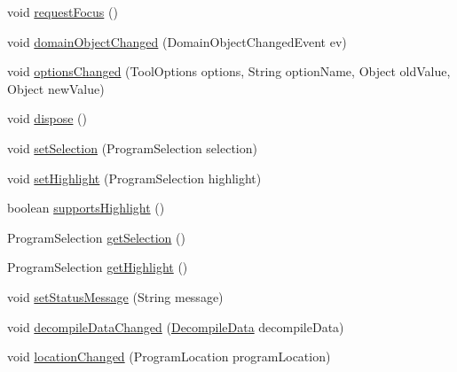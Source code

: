 \begin{DoxyCompactItemize}
\item 
void \mbox{\hyperlink{classghidra_1_1app_1_1plugin_1_1core_1_1decompile_1_1_decompiler_provider_a5beeeee3a7f121f6ab3ea59ea1cc08e1}{request\+Focus}} ()
\item 
void \mbox{\hyperlink{classghidra_1_1app_1_1plugin_1_1core_1_1decompile_1_1_decompiler_provider_a69d8ae7b9339f71a91dea1d62c5aca48}{domain\+Object\+Changed}} (Domain\+Object\+Changed\+Event ev)
\item 
void \mbox{\hyperlink{classghidra_1_1app_1_1plugin_1_1core_1_1decompile_1_1_decompiler_provider_a480fb4cdd2f86f488d1d269b53c0e872}{options\+Changed}} (Tool\+Options options, String option\+Name, Object old\+Value, Object new\+Value)
\item 
void \mbox{\hyperlink{classghidra_1_1app_1_1plugin_1_1core_1_1decompile_1_1_decompiler_provider_a6c2bbf952c8ea1a6b9623c7c3e9395c4}{dispose}} ()
\item 
void \mbox{\hyperlink{classghidra_1_1app_1_1plugin_1_1core_1_1decompile_1_1_decompiler_provider_a8f71722592aba9ce781d418d25aa8f3c}{set\+Selection}} (Program\+Selection selection)
\item 
void \mbox{\hyperlink{classghidra_1_1app_1_1plugin_1_1core_1_1decompile_1_1_decompiler_provider_a70d281d89b70480c49cf4463c829130d}{set\+Highlight}} (Program\+Selection highlight)
\item 
boolean \mbox{\hyperlink{classghidra_1_1app_1_1plugin_1_1core_1_1decompile_1_1_decompiler_provider_ad741dde6f2290fad9cb1e7ed0e83893d}{supports\+Highlight}} ()
\item 
Program\+Selection \mbox{\hyperlink{classghidra_1_1app_1_1plugin_1_1core_1_1decompile_1_1_decompiler_provider_a6c547b13fd13dc3b749a1c73d77f19bf}{get\+Selection}} ()
\item 
Program\+Selection \mbox{\hyperlink{classghidra_1_1app_1_1plugin_1_1core_1_1decompile_1_1_decompiler_provider_a34933fd2f3f357b09b4449a06f012bb5}{get\+Highlight}} ()
\item 
void \mbox{\hyperlink{classghidra_1_1app_1_1plugin_1_1core_1_1decompile_1_1_decompiler_provider_a729c019df8772c0ae39d1bce67b88ee5}{set\+Status\+Message}} (String message)
\item 
void \mbox{\hyperlink{classghidra_1_1app_1_1plugin_1_1core_1_1decompile_1_1_decompiler_provider_a03b1fe5f65766c675710ccd7ac03bc02}{decompile\+Data\+Changed}} (\mbox{\hyperlink{classghidra_1_1app_1_1decompiler_1_1component_1_1_decompile_data}{Decompile\+Data}} decompile\+Data)
\item 
void \mbox{\hyperlink{classghidra_1_1app_1_1plugin_1_1core_1_1decompile_1_1_decompiler_provider_afbefb9a625e7ff455be0aa5352f52347}{location\+Changed}} (Program\+Location program\+Location)

\end{DoxyCompactItemize}
